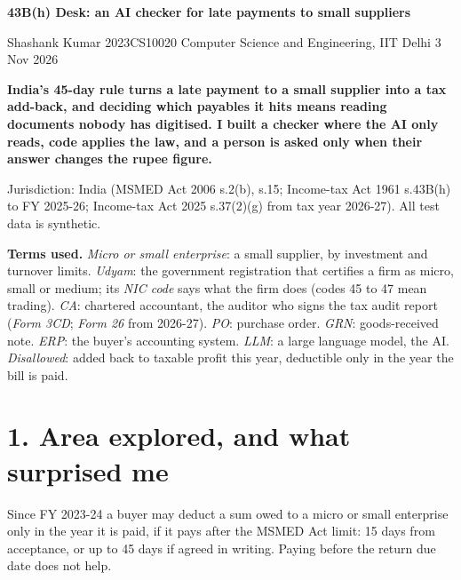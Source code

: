 \documentclass[10pt,a4paper]{article}
\begin{document}
\small
{\Large\bfseries 43B(h) Desk: an AI checker for late payments to small suppliers\par}
\vspace{2pt}
{\footnotesize\color{muted} Shashank Kumar \textperiodcentered{} 2023CS10020 \textperiodcentered{} Computer Science and Engineering, IIT Delhi \textperiodcentered{} 3 Nov 2026\par}
\vspace{4pt}
\textbf{India's 45-day rule turns a late payment to a small supplier into a tax add-back, and deciding which payables it hits means reading documents nobody has digitised. I built a checker where the AI only reads, code applies the law, and a person is asked only when their answer changes the rupee figure.}

Jurisdiction: India (MSMED Act 2006 s.2(b), s.15; Income-tax Act 1961 s.43B(h) to FY 2025-26; Income-tax Act 2025 s.37(2)(g) from tax year 2026-27). All test data is synthetic.

{\footnotesize\textbf{Terms used.} \textit{Micro or small enterprise}: a small supplier, by investment and turnover limits. \textit{Udyam}: the government registration that certifies a firm as micro, small or medium; its \textit{NIC code} says what the firm does (codes 45 to 47 mean trading). \textit{CA}: chartered accountant, the auditor who signs the tax audit report (\textit{Form 3CD}; \textit{Form 26} from 2026-27). \textit{PO}: purchase order. \textit{GRN}: goods-received note. \textit{ERP}: the buyer's accounting system. \textit{LLM}: a large language model, the AI. \textit{Disallowed}: added back to taxable profit this year, deductible only in the year the bill is paid.\par}

\section*{1. Area explored, and what surprised me}

Since FY 2023-24 a buyer may deduct a sum owed to a micro or small enterprise only in the year it is paid, if it pays after the MSMED Act limit: 15 days from acceptance, or up to 45 days if agreed in writing. Paying before the return due date does not help.
\end{document}
